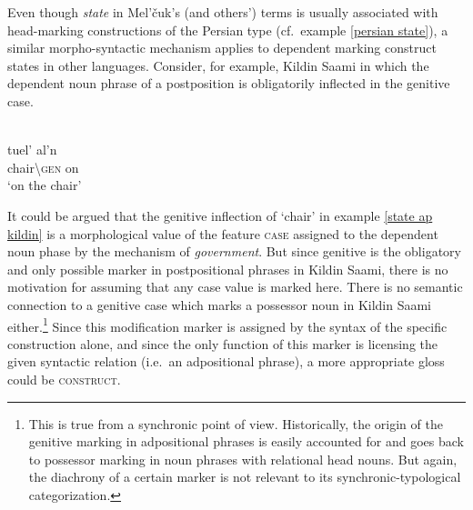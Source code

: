 Even though \emph{state} in Mel'čuk's (and others') terms is usually associated with head-marking constructions of the Persian type (cf.~example \ref{persian state}), a similar morpho-syntactic mechanism applies to dependent marking construct states in other languages. Consider, for example, Kildin Saami in which the dependent noun phrase of a postposition is obligatorily inflected in the genitive case.
\begin{exe}
\ex\label{state ap kildin} 
\\
\gll 	tuel'		al'n\\
	chair\textbackslash\textsc{gen}	on\\
\glt 	‘on the chair’
\end{exe}
It could be argued that the genitive inflection of ‘chair’ in example \ref{state ap kildin} is a morphological value of the feature \textsc{case} assigned to the dependent noun phase by the mechanism of \emph{government}. But since genitive is the obligatory and only possible marker in postpositional phrases in Kildin Saami, there is no motivation for assuming that any case value is marked here. There is no semantic connection to a genitive case which marks a possessor noun in Kildin Saami either.\footnote{This is true from a synchronic point of view. Historically, the origin of the genitive marking in adpositional phrases is easily accounted for and goes back to possessor marking in noun phrases with relational head nouns. But again, the diachrony of a certain marker is not relevant to its synchronic-typological categorization.} Since this modification marker is assigned by the syntax of the specific construction alone, and since the only function of this marker is licensing the given syntactic relation (i.e.~an adpositional phrase), a more appropriate gloss could be \textsc{construct}.

